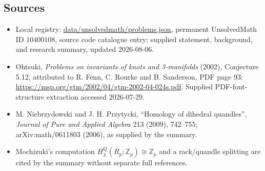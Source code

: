 \documentclass[11pt]{article}
\begin{document}
\subsection{Sources}
\begin{itemize}
\item Local registry: \url{data/unsolvedmath/problems.json}, permanent UnsolvedMath ID \(10400108\), source code catalogue entry; supplied statement, background, and research summary, updated 2026-08-06.
\item Ohtsuki, \emph{Problems on invariants of knots and 3-manifolds} (2002), Conjecture 5.12, attributed to R. Fenn, C. Rourke and B. Sanderson, PDF page 93: \url{https://msp.org/gtm/2002/04/gtm-2002-04-024s.pdf}. Supplied PDF-font-structure extraction accessed 2026-07-29.
\item M. Niebrzydowski and J. H. Przytycki, ``Homology of dihedral quandles'', \emph{Journal of Pure and Applied Algebra} 213 (2009), 742--755; arXiv:math/0611803 (2006), as supplied by the summary.
\item Mochizuki's computation \(H_3^Q(R_p;\mathbb Z_p)\cong\mathbb Z_p\) and a rack/quandle splitting are cited by the summary without separate full references.
\end{itemize}
\end{document}
